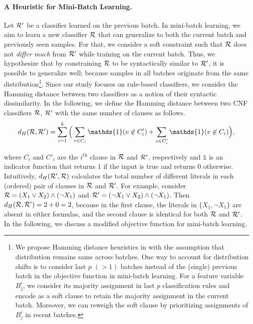 \paragraph{A Heuristic for Mini-Batch Learning.} Let $ {\mathcal{R}}' $ be a classifier learned on the previous batch. In mini-batch learning, we aim to learn a new classifier $ {\mathcal{R}} $ that can generalize to both the current batch and previously seen samples. For that, we consider a soft constraint such that $ {\mathcal{R}} $ does not \emph{differ much} from $ {\mathcal{R}}' $ while training on the current batch. Thus, we hypothesize that by constraining $ {\mathcal{R}} $ to be syntactically similar to $ {\mathcal{R}}' $, it is possible to generalize well; because samples in all batches originate from the same distribution\footnote{We propose Hamming distance heuristics in {\imli} with the assumption that distribution remains same across batches. One way to account for distribution shifts is to consider last $ p $  $ (> 1) $ batches instead of the (single) previous batch in the objective function in mini-batch learning. For a feature variable $ B^i_j $, we consider its majority assignment in last $ p $ classification rules and encode as a soft clause to retain the majority assignment in the current batch. Moreover, we can reweigh the soft clause by prioritizing assignments of $ B^i_j $ in recent batches.}. Since our study focuses on rule-based classifiers, we consider the Hamming distance between two classifiers as a notion of their syntactic dissimilarity. In the following, we define the Hamming distance between two CNF classifiers $ {\mathcal{R}} $, $ {\mathcal{R}}' $ with the same number of clauses as follows.
\[
	d_{H}(\Rule, \Rule') = \sum_{i=1}^k \Big(\sum_{v\in C_i} \mathds{1}(v \not\in C'_i) +  \sum_{v\in C'_i} \mathds{1}(v \not\in C_i) \Big), 
\]
 
 where $ C_i $ and $ C'_i $ are the $ i^\text{th} $ clause in $ {\mathcal{R}} $ and $ {\mathcal{R}}' $, respectively and $ \mathds{1} $ is an indicator function that returns $ 1 $ if the input is true and returns $ 0 $ otherwise.  Intuitively, $ d_{H}({\mathcal{R}}', {\mathcal{R}}) $ calculates the total number of different literals in each (ordered) pair of clauses in $ {\mathcal{R}} $  and $ {\mathcal{R}}' $.  For example, consider $ {\mathcal{R}} = (X_1 \vee X_2) \wedge (\neg X_1) $ and $ {\mathcal{R}}' = (\neg X_1 \vee X_2) \wedge (\neg X_1) $. Then $ 	d_{H}({\mathcal{R}}, {\mathcal{R}}') = 2 + 0 = 2 $, because in the first clause, the  literals in $ \{X_1, \neg X_1\} $ are absent in either formulas, and the second clause is identical for both $ {\mathcal{R}} $ and $ {\mathcal{R}}' $. In the following, we discuss a modified objective function for mini-batch learning.



